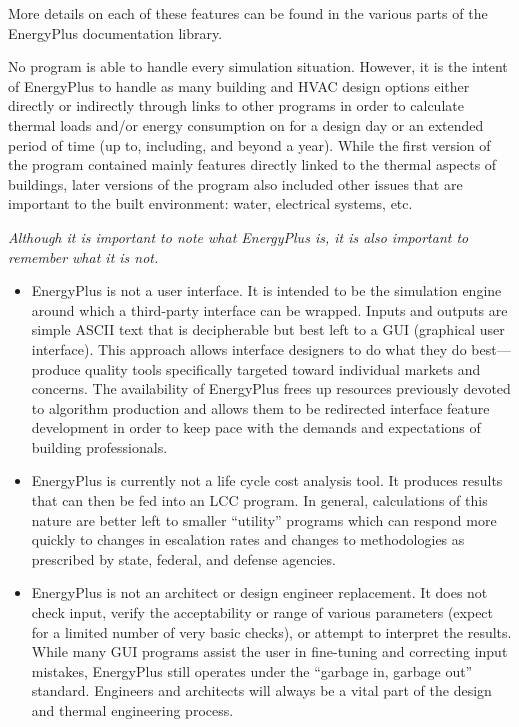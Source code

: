 More details on each of these features can be found in the various parts of the EnergyPlus documentation library.

No program is able to handle every simulation situation. However, it is the intent of EnergyPlus to handle as many building and HVAC design options either directly or indirectly through links to other programs in order to calculate thermal loads and/or energy consumption on for a design day or an extended period of time (up to, including, and beyond a year). While the first version of the program contained mainly features directly linked to the thermal aspects of buildings, later versions of the program also included other issues that are important to the built environment: water, electrical systems, etc.

\emph{Although it is important to note what EnergyPlus is, it is also important to remember what it is not.}

\begin{itemize}
\item
  EnergyPlus is not a user interface. It is intended to be the simulation engine around which a third-party interface can be wrapped. Inputs and outputs are simple ASCII text that is decipherable but best left to a GUI (graphical user interface). This approach allows interface designers to do what they do best---produce quality tools specifically targeted toward individual markets and concerns. The availability of EnergyPlus frees up resources previously devoted to algorithm production and allows them to be redirected interface feature development in order to keep pace with the demands and expectations of building professionals.
\item
  EnergyPlus is currently not a life cycle cost analysis tool. It produces results that can then be fed into an LCC program. In general, calculations of this nature are better left to smaller ``utility'' programs which can respond more quickly to changes in escalation rates and changes to methodologies as prescribed by state, federal, and defense agencies.
\item
  EnergyPlus is not an architect or design engineer replacement. It does not check input, verify the acceptability or range of various parameters (expect for a limited number of very basic checks), or attempt to interpret the results. While many GUI programs assist the user in fine-tuning and correcting input mistakes, EnergyPlus still operates under the ``garbage in, garbage out'' standard. Engineers and architects will always be a vital part of the design and thermal engineering process.
\end{itemize}
